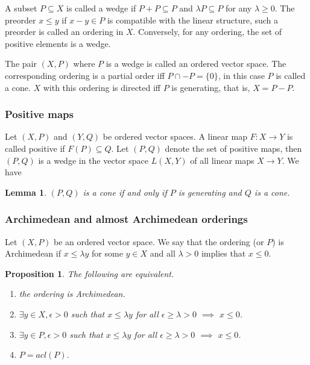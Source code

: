 \documentclass[12pt]{article}
\newtheorem{lemma}{Lemma}
\newtheorem{prop}{Proposition}
\theoremstyle{remark}
\newcommand{\<}{\langle}
\begin{document}
A subset $P\subseteq X$ is called a  wedge if $P+P\subseteq P$ and $\lambda P\subseteq P$ for any $\lambda\ge 0$. The preorder $x\le y$ if $x-y\in P$ is compatible with the linear structure, such a preorder is called an ordering in $X$. Conversely, for any ordering, the set of positive elements  is a wedge.

The pair $(X,P)$ where $P$ is a wedge is called an ordered vector space. 
The corresponding ordering is a partial order iff $P\cap -P=\{0\}$, in this case $P$ is called a cone. 
$X$ with this ordering is directed  iff $P$ is generating, that is,  $X=P-P$. 

\subsubsection*{Positive maps}

Let $(X,P)$ and $(Y,Q)$ be ordered vector spaces. A  linear map $F:X\to Y$ is called positive if $F(P)\subseteq Q$.
 Let  $(P,Q)$ denote the set of positive maps, then $(P,Q)$ is a wedge in the vector space $L(X,Y)$ of all linear maps $X\to Y$. We have

\begin{lemma}\label{lemma:duality_morph} $(P,Q)$ is a cone if and only if $P$ is generating and $Q$ is a cone.

\end{lemma}

\subsubsection*{Archimedean and almost Archimedean orderings}

Let $(X,P)$ be an ordered vector space. We say that the ordering (or $P$) is Archimedean if 
 $x\le \lambda y$ for some $y\in X$ and all $\lambda> 0$ implies that $x\le 0$. 
\begin{prop}
The following are equivalent.
\begin{enumerate}
\item[(i)] the ordering is Archimedean.
\item[(ii)]  $\exists y\in X, \epsilon >0$ such that  $x\le \lambda y$ for all $\epsilon\ge \lambda>0$ $\implies$ $x\le 0$.
\item[(iii)] $\exists y\in P, \epsilon >0$ such that  $x\le \lambda y$ for all $\epsilon\ge \lambda>0$ $\implies$ $x\le 0$.
\item[(iv)] $P=acl(P)$.
\end{enumerate}
\end{prop}
\end{document}
